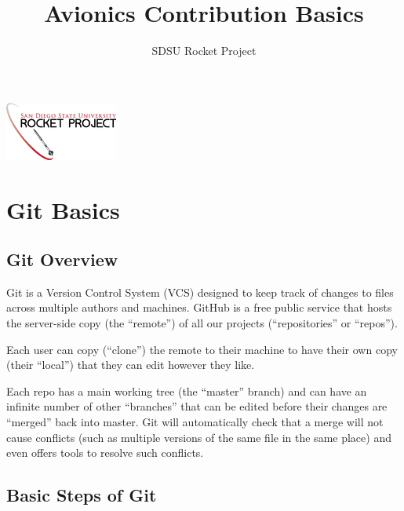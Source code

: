 \documentclass{article}
\title{Avionics Contribution Basics}
\author{SDSU Rocket Project}
\begin{document}
\maketitle

\begin{center}
	\includegraphics{rocketlogo.png}
\end{center}

\tableofcontents

\pagebreak

\section{Git Basics}

\subsection{Git Overview}

Git is a Version Control System (VCS) designed to keep track of changes to files across multiple authors and machines.
GitHub is a free public service that hosts the server-side copy (the ``remote'') of all our projects (``repositories'' or ``repos'').

\noindent
Each user can copy (``clone'') the remote to their machine to have their own copy (their ``local'') that they can edit however they like.

\noindent
Each repo has a main working tree (the ``master'' branch) and can have an infinite number of other ``branches'' that can be edited before their changes are ``merged'' back into master.
Git will automatically check that a merge will not cause conflicts (such as multiple versions of the same file in the same place) and even offers tools to resolve such conflicts.

\subsection{Basic Steps of Git}
\end{document}
